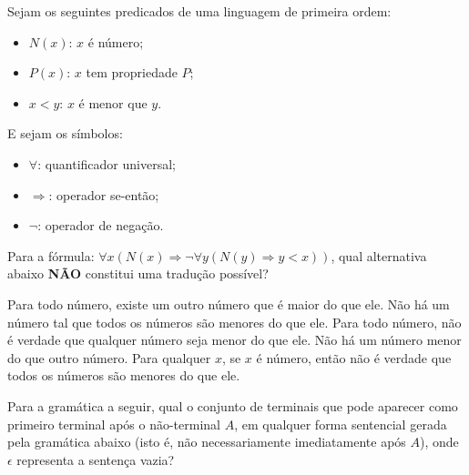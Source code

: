 \documentclass[12pt, addpoints]{exam}
\begin{document}
\begin{questions}
\question

Sejam os seguintes predicados de uma linguagem de primeira ordem:



\begin{itemize}

    \item \( N(x) \): \( x \) é número;

    \item \( P(x) \): \( x \) tem propriedade \( P \);

    \item \( x < y \): \( x \) é menor que \( y \).

\end{itemize}



E sejam os símbolos:

\begin{itemize}

    \item \( \forall \): quantificador universal;

    \item \( \Rightarrow \): operador se-então;

    \item \( \neg \): operador de negação.

\end{itemize}



Para a fórmula: \( \forall x (N(x) \Rightarrow \neg \forall y (N(y) \Rightarrow y < x)) \), qual alternativa abaixo \textbf{NÃO} constitui uma tradução possível?


\begin{choices}
\choice Para todo número, existe um outro número que é maior do que ele.
\choice Não há um número tal que todos os números são menores do que ele.
\choice Para todo número, não é verdade que qualquer número seja menor do que ele.
\choice Não há um número menor do que outro número.
\choice Para qualquer \( x \), se \( x \) é número, então não é verdade que todos os números são menores do que ele.
\end{choices}

\question

Para a gramática a seguir, qual o conjunto de terminais que pode aparecer como primeiro terminal após o não-terminal \( A \), em qualquer forma sentencial gerada pela gramática abaixo (isto é, não necessariamente imediatamente após \( A \)), onde \( \epsilon \) representa a sentença vazia?




\end{questions}
\end{document}
